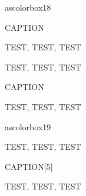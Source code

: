 ascolorbox18

\begin{ascolorbox18}{CAPTION}

TEST, TEST, TEST

\end{ascolorbox18}

\begin{ascolorbox18}{}

TEST, TEST, TEST

\end{ascolorbox18}

\begin{ascolorbox19}{CAPTION}

TEST, TEST, TEST

ascolorbox19

\end{ascolorbox19}

\begin{ascolorbox19}{}

TEST, TEST, TEST

\end{ascolorbox19}

\begin{ascolorbox19}{CAPTION}[5]

TEST, TEST, TEST

\end{ascolorbox19}

